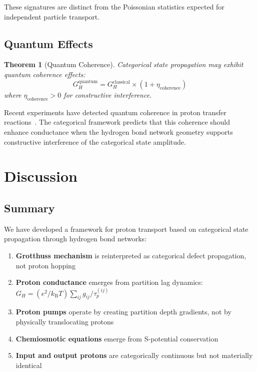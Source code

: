 \documentclass[twocolumn,showpacs,preprintnumbers,amsmath,amssymb,prd]{revtex4-2}
\newtheorem{theorem}{Theorem}[section]
\newcommand{\taup}{\tau_p}
\newcommand{\kB}{k_{\text{B}}}
\begin{document}
These signatures are distinct from the Poissonian statistics expected for independent particle transport.

\subsection{Quantum Effects}

\begin{theorem}[Quantum Coherence]
\label{thm:quantum}
Categorical state propagation may exhibit quantum coherence effects:
\begin{equation}
G_H^{\text{quantum}} = G_H^{\text{classical}} \times \left(1 + \eta_{\text{coherence}}\right)
\label{eq:quantum_enhancement}
\end{equation}
where $\eta_{\text{coherence}} > 0$ for constructive interference.
\end{theorem}

Recent experiments have detected quantum coherence in proton transfer reactions~\cite{Scholes2017}. The categorical framework predicts that this coherence should enhance conductance when the hydrogen bond network geometry supports constructive interference of the categorical state amplitude.


\section{Discussion}
\label{sec:discussion}

\subsection{Summary}

We have developed a framework for proton transport based on categorical state propagation through hydrogen bond networks:

\begin{enumerate}
\item \textbf{Grotthuss mechanism} is reinterpreted as categorical defect propagation, not proton hopping

\item \textbf{Proton conductance} emerges from partition lag dynamics: $G_H = (e^2/\kB T)\sum_{ij}g_{ij}/\taup^{(ij)}$

\item \textbf{Proton pumps} operate by creating partition depth gradients, not by physically translocating protons

\item \textbf{Chemiosmotic equations} emerge from S-potential conservation

\item \textbf{Input and output protons} are categorically continuous but not materially identical
\end{enumerate}
\end{document}
